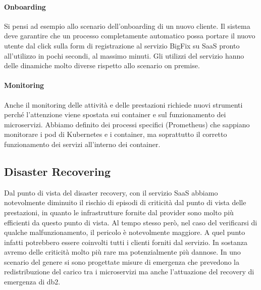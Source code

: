 \paragraph{Onboarding}
Si pensi ad esempio allo scenario dell'onboarding di un nuovo cliente. Il sistema deve garantire che un processo completamente automatico possa portare il nuovo utente dal click sulla form di registrazione al servizio BigFix su SaaS pronto all'utilizzo in pochi secondi, al massimo minuti. Gli utilizzi del servizio hanno delle dinamiche molto diverse rispetto allo scenario on premise.

\paragraph{Monitoring}
Anche il monitoring delle attività e delle prestazioni richiede nuovi strumenti perché l'attenzione viene spostata sui container e sul funzionamento dei microservizi. Abbiamo definito dei processi specifici (Prometheus) che sappiano monitorare i pod di Kubernetes e i container, ma soprattutto il corretto funzionamento dei servizi all'interno dei container.

\subsection{Disaster Recovering}
Dal punto di vista del disaster recovery, con il servizio SaaS abbiamo notevolmente diminuito il rischio di episodi di criticità dal punto di vista delle prestazioni, in quanto le infrastrutture fornite dal provider sono molto più efficienti da questo punto di vista. Al tempo stesso però, nel caso del verificarsi di qualche malfunzionamento, il pericolo è notevolmente maggiore. A quel punto infatti potrebbero essere coinvolti tutti i clienti forniti dal servizio. In sostanza avremo delle criticità molto più rare ma potenzialmente più dannose. In uno scenario del genere si sono progettate misure di emergenza che prevedono la redistribuzione del carico tra i microservizi ma anche l'attuazione del recovery di emergenza di db2.
